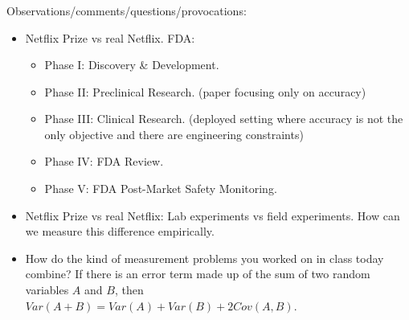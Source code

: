 \documentclass[aspectratio=169]{beamer}
\begin{document}
\begin{frame}
\frametitle{}

Observations/comments/questions/provocations:
\begin{itemize}
\item Netflix Prize vs real Netflix. FDA:  
\begin{itemize}
\item Phase I: Discovery \& Development.
\item Phase II: Preclinical Research. (paper focusing only on accuracy)
\item Phase III: Clinical Research. (deployed setting where accuracy is not the only objective and there are engineering constraints)
\item Phase IV: FDA Review.
\item Phase V: FDA Post-Market Safety Monitoring.
\end{itemize}
\pause
\item Netflix Prize vs real Netflix: Lab experiments vs field experiments.  How can we measure this difference empirically.
\pause
\item How do the kind of measurement problems you worked on in class today combine?  If there is an error term made up of the sum of two random variables $A$ and $B$, then $Var(A+B) = Var(A) + Var(B) + 2Cov(A,B)$.
\end{itemize}

\end{frame}
\frame{\titlepage}
\end{document}
